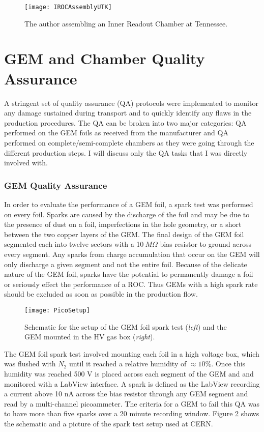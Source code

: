 \begin{figure}[b!]
\texttt{[image: IROCAssemblyUTK]}
\centering
\caption{The author assembling an Inner Readout Chamber at Tennessee. }
\label{fig:IROCassm}
\end{figure}

\section{GEM and Chamber Quality Assurance}

A stringent set of quality assurance (QA)\cite{Brucken:2018rej}\cite{Brucken:2017qjy} protocols were implemented to monitor any damage sustained during transport and to quickly identify any flaws in the production procedures.  The QA can be broken into two major categories: QA performed on the GEM foils as received from the manufacturer and QA performed on complete/semi-complete chambers as they were going through the different production steps.  I will discuss only the QA tasks that I was directly involved with.

\subsubsection{GEM Quality Assurance}

In order to evaluate the performance of a GEM foil, a spark test was performed on every foil.  Sparks are caused by the discharge of the foil and may be due to the presence of dust on a foil, imperfections in the hole geometry, or a short between the two copper layers of the GEM.  The final design of the GEM foil segmented each into twelve sectors with a 10$\: M \Omega$ bias resistor to ground across every segment.  Any sparks from charge accumulation that occur on the GEM will only discharge a given segment and not the entire foil.  Because of the delicate nature of the GEM foil, sparks have the potential to permanently damage a foil or seriously effect the performance of a ROC.  Thus GEMs with a high spark rate should be excluded as soon as possible in the production flow.

\begin{figure}[b!]
\texttt{[image: PicoSetup]}
\centering
\caption{Schematic for the setup of the GEM foil spark test (\textit{left})\cite{Brucken:2018rej} and the GEM mounted in the HV gas box (\textit{right}). }
\label{fig:PicoSetup}
\end{figure}


The GEM foil spark test involved mounting each foil in a high voltage box, which was flushed with $N_{2}$ until it reached a relative humidity of $\approx 10\%$.  Once this humidity was reached 500 V is placed across each segment of the GEM and and monitored with a LabView interface.  A spark is defined as the LabView recording a current above 10 nA across the bias resistor through any GEM segment and read by a multi-channel picoammeter.  The criteria for a GEM to fail this QA was to have more than five sparks over a 20 minute recording window.  Figure \ref{fig:PicoSetup} shows the schematic and a picture of the spark test setup used at CERN.

